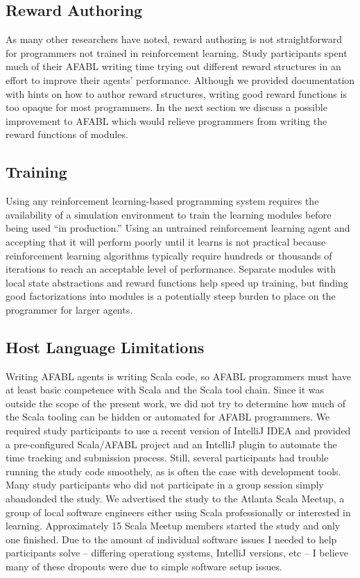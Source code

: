 
\subsection{Reward Authoring}

As many other researchers have noted, reward authoring is not straightforward for programmers not trained in reinforcement learning. Study participants spent much of their AFABL writing time trying out different reward structures in an effort to improve their agents' performance. Although we provided documentation with hints on how to author reward structures, writing good reward functions is too opaque for most programmers. In the next section we discuss a possible improvement to AFABL which would relieve programmers from writing the reward functions of modules.

\subsection{Training}

Using any reinforcement learning-based programming system requires the availability of a simulation environment to train the learning modules before being used ``in production.'' Using an untrained reinforcement learning agent and accepting that it will perform poorly until it learns is not practical because reinforcement learning algorithms typically require hundreds or thousands of iterations to reach an acceptable level of performance. Separate modules with local state abstractions and reward functions help speed up training, but finding good factorizations into modules is a potentially steep burden to place on the programmer for larger agents.

\subsection{Host Language Limitations}

Writing AFABL agents is writing Scala code, so AFABL programmers must have at least basic competence with Scala and the Scala tool chain. Since it was outside the scope of the present work, we did not try to determine how much of the Scala tooling can be hidden or automated for AFABL programmers. We required study participants to use a recent version of IntelliJ IDEA and provided a pre-configured Scala/AFABL project and an IntelliJ plugin to automate the time tracking and submission process. Still, several participants had trouble running the study code smoothely, as is often the case with development tools. Many study participants who did not participate in a group session simply abandonded the study. We advertised the study to the Atlanta Scala Meetup, a group of local software engineers either using Scala professionally or interested in learning. Approximately 15 Scala Meetup members started the study and only one finished. Due to the amount of individual software issues I needed to help participants solve -- differing operationg systems, IntelliJ versions, etc -- I believe many of these dropouts were due to simple software setup issues.

